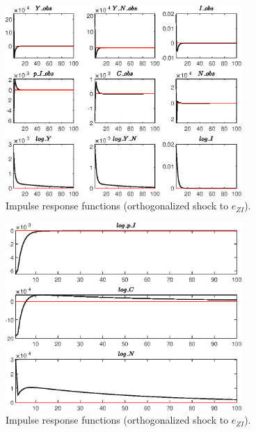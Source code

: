 \begin{figure}[H]
\centering 
\includegraphics[width=0.80\textwidth]{BRS_growth_res/graphs/BRS_growth_res_IRF_e_ZI1}
\caption{Impulse response functions (orthogonalized shock to ${e_{ZI}}$).}\label{Fig:IRF:e_ZI:1}
\end{figure}
 
\begin{figure}[H]
\centering 
\includegraphics[width=0.80\textwidth]{BRS_growth_res/graphs/BRS_growth_res_IRF_e_ZI2}
\caption{Impulse response functions (orthogonalized shock to ${e_{ZI}}$).}\label{Fig:IRF:e_ZI:2}
\end{figure}
 
